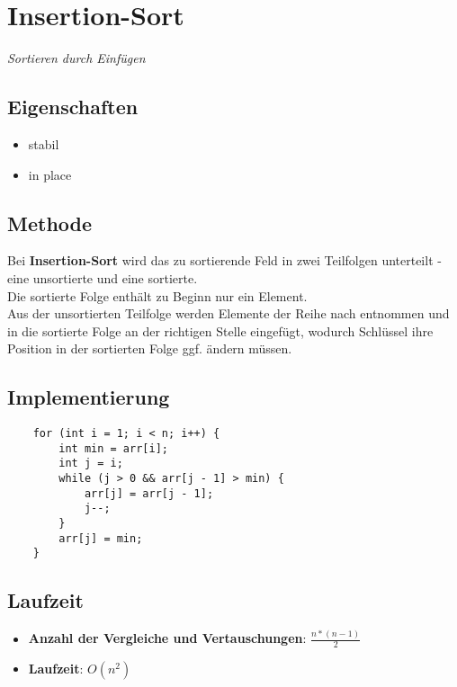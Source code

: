 \section{Insertion-Sort}

\textit{Sortieren durch Einfügen}

\subsection{Eigenschaften}
\begin{itemize}
    \item stabil
    \item in place
\end{itemize}

\subsection{Methode}
Bei \textbf{Insertion-Sort} wird das zu sortierende Feld in zwei Teilfolgen unterteilt - eine unsortierte und eine sortierte.\\
Die sortierte Folge enthält zu Beginn nur ein Element.\\
Aus der unsortierten Teilfolge werden Elemente der Reihe nach entnommen und in die sortierte Folge an der richtigen Stelle eingefügt, wodurch Schlüssel ihre Position in der sortierten Folge ggf. ändern müssen.


\subsection{Implementierung}
\begin{verbatim}
    for (int i = 1; i < n; i++) {
        int min = arr[i];
        int j = i;
        while (j > 0 && arr[j - 1] > min) {
            arr[j] = arr[j - 1];
            j--;
        }
        arr[j] = min;
    }
\end{verbatim}


\subsection{Laufzeit}
\begin{itemize}
    \item \textbf{Anzahl der Vergleiche und Vertauschungen}: $\frac{n * ( n - 1)}{2}$
    \item \textbf{Laufzeit}: $O(n^2)$
\end{itemize}